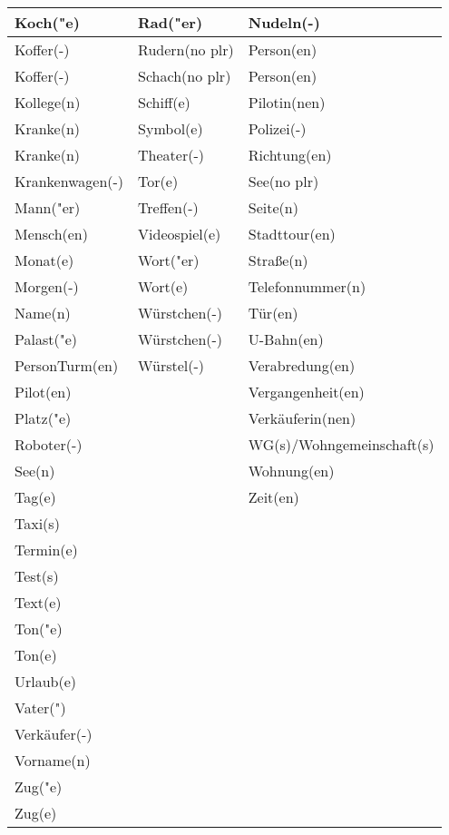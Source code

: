 \documentclass{article}
\begin{document}
\begin{table}[h!]
\begin{tabular}{|>{\raggedright\arraybackslash}p{5cm}|>{\raggedright\arraybackslash}p{5cm}|>{\raggedright\arraybackslash}p{5cm}|}
        Koch("e) & Rad("er) & Nudeln(-) \\\hline
        Koffer(-) & Rudern(no plr) & Person(en) \\\hline
        Koffer(-) & Schach(no plr) & Person(en) \\\hline
        Kollege(n) & Schiff(e) & Pilotin(nen) \\\hline
        Kranke(n) & Symbol(e) & Polizei(-) \\\hline
        Kranke(n) & Theater(-) & Richtung(en) \\\hline
        Krankenwagen(-) & Tor(e) & See(no plr) \\\hline
        Mann("er) & Treffen(-) & Seite(n) \\\hline
        Mensch(en) & Videospiel(e) & Stadttour(en) \\\hline
        Monat(e) & Wort("er) & Stra\ss{}e(n) \\\hline
        Morgen(-) & Wort(e) & Telefonnummer(n) \\\hline
        Name(n) & Würstchen(-) & Tür(en) \\\hline
        Palast("e) & Würstchen(-) & U-Bahn(en) \\\hline
        PersonTurm(en) & Würstel(-) & Verabredung(en) \\\hline
        Pilot(en) &  & Vergangenheit(en) \\\hline
        Platz("e) &  & Verkäuferin(nen) \\\hline
        Roboter(-) &  & WG(s)/Wohngemeinschaft(s) \\\hline
        See(n) &  & Wohnung(en) \\\hline
        Tag(e) &  & Zeit(en) \\\hline
        Taxi(s) &  &  \\\hline
        Termin(e) &  &  \\\hline
        Test(s) &  &  \\\hline
        Text(e) &  &  \\\hline
        Ton("e) &  &  \\\hline
        Ton(e) &  &  \\\hline
        Urlaub(e) &  &  \\\hline
        Vater(") &  &  \\\hline
        Verkäufer(-) &  &  \\\hline
        Vorname(n) &  &  \\\hline
        Zug("e) &  &  \\\hline
        Zug(e) &  &  \\\hline
    \end{tabular}
\end{table}
\end{document}
